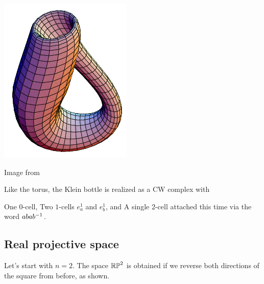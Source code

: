 \begin{center}
\begin{minipage}[c]{0.5\textwidth}
	\end{minipage}
	\quad
	\begin{minipage}[c]{0.3\textwidth}
	\includegraphics[width=\textwidth]{media/KleinBottle-01.png}
	\end{minipage}

	\scriptsize Image from \cite{img:kleinfold,img:kleinbottle}
\end{center}


Like the torus, the Klein bottle is realized as a CW complex with
\begin{itemize}
	\ii One $0$-cell,
	\ii Two $1$-cells $e^1_a$ and $e^1_b$, and
	\ii A single $2$-cell attached this time via the word $abab^{-1}$.
\end{itemize}

\subsection*{Real projective space}
Let's start with $n=2$.
The space $\mathbb{RP}^2$ is obtained if we reverse both directions of
the square from before, as shown.

